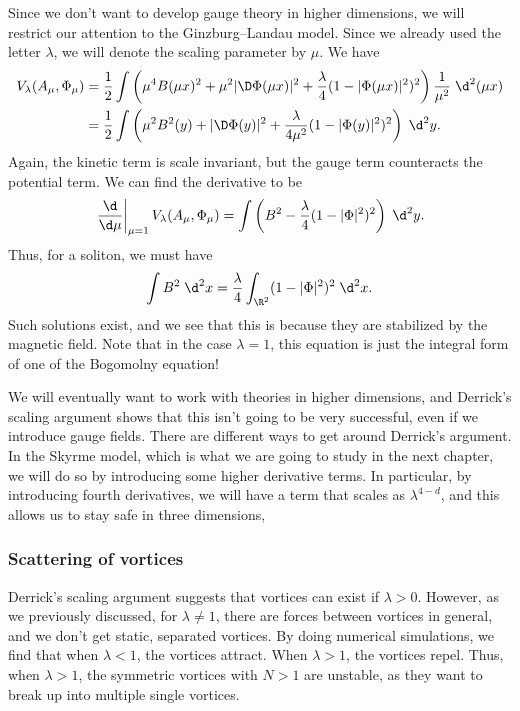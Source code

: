 \documentclass[a4paper]{article}
\begin{document}
Since we don't want to develop gauge theory in higher dimensions, we will restrict our attention to the Ginzburg--Landau model. Since we already used the letter $\lambda$, we will denote the scaling parameter by $\mu$. We have
\begin{align*}
  V_\lambda(A_\mu, \Phi_\mu) &= \frac{1}{2} \int \left(\mu^4 B(\mu x)^2 + \mu^2 |\D \Phi(\mu x)|^2 + \frac{\lambda}{4} (1 - |\Phi(\mu x)|^2)^2\right) \frac{1}{\mu^2}\;\d^2 (\mu x)\\
  &= \frac{1}{2} \int \left(\mu^2 B^2(y) + |\D \Phi(y)|^2 + \frac{\lambda}{4 \mu^2} (1 - |\Phi(y)|^2)^2\right)\;\d^2 y.
\end{align*}
Again, the kinetic term is scale invariant, but the gauge term counteracts the potential term. We can find the derivative to be
\[
  \left.\frac{\d}{\d \mu}\right|_{\mu = 1} V_\lambda(A_\mu, \Phi_\mu) = \int \left(B^2 - \frac{\lambda}{4}(1 - |\Phi|^2)^2\right)\;\d^2 y.
\]
Thus, for a soliton, we must have
\[
  \int B^2\;\d^2 x = \frac{\lambda}{4} \int_{\R^2} (1 - |\Phi|^2)^2 \;\d^2 x.
\]
Such solutions exist, and we see that this is because they are stabilized by the magnetic field. Note that in the case $\lambda = 1$, this equation is just the integral form of one of the Bogomolny equation!

We will eventually want to work with theories in higher dimensions, and Derrick's scaling argument shows that this isn't going to be very successful, even if we introduce gauge fields. There are different ways to get around Derrick's argument. In the Skyrme model, which is what we are going to study in the next chapter, we will do so by introducing some higher derivative terms. In particular, by introducing fourth derivatives, we will have a term that scales as $\lambda^{4 - d}$, and this allows us to stay safe in three dimensions, 

\subsubsection*{Scattering of vortices}
Derrick's scaling argument suggests that vortices can exist if $\lambda > 0$. However, as we previously discussed, for $\lambda \not= 1$, there are forces between vortices in general, and we don't get static, separated vortices. By doing numerical simulations, we find that when $\lambda < 1$, the vortices attract. When $\lambda > 1$, the vortices repel. Thus, when $\lambda > 1$, the symmetric vortices with $N > 1$ are unstable, as they want to break up into multiple single vortices.
\end{document}
